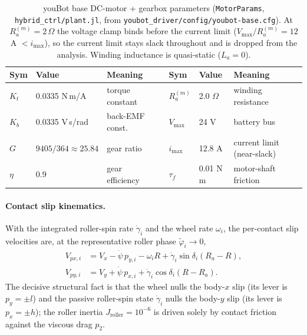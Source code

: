 \documentclass[11pt]{article}
\begin{document}
\begin{table}[h]\centering\small
\begin{tabular}{llll@{\hskip 2em}llll}
\toprule
Sym & Value & Meaning & & Sym & Value & Meaning\\
\midrule
$K_t$ & 0.0335 N\,m/A & torque constant & & $R_a^{(m)}$ & 2.0 $\Omega$ & winding resistance\\
$K_b$ & 0.0335 V\,s/rad & back-EMF const. & & $V_{\max}$ & 24 V & battery bus\\
$G$ & $9405/364\approx25.84$ & gear ratio & & $i_{\max}$ & 12.8 A & current limit (near-slack)\\
$\eta$ & 0.9 & gear efficiency & & $\tau_f$ & 0.01 N\,m & motor-shaft friction\\
\bottomrule
\end{tabular}
\caption{youBot base DC-motor + gearbox parameters (\texttt{MotorParams},
\texttt{hybrid\_ctrl/plant.jl}, from \texttt{youbot\_driver/config/youbot-base.cfg}). At
$R_a^{(m)}=2\,\Omega$ the voltage clamp binds before the current limit
($V_{\max}/R_a^{(m)}=12$ A $<i_{\max}$), so the current limit stays slack throughout and is
dropped from the analysis. Winding inductance is quasi-static ($L_a=0$).}
\label{tab:motor}
\end{table}

\paragraph{Contact slip kinematics.} With the integrated roller-spin rate $\dot\gamma_i$ and
the wheel rate $\omega_i$, the per-contact slip velocities are, at the representative roller
phase $\tilde\varphi_i\to0$,
\begin{align}
V_{px,i}&=V_x-\dot\psi\,p_{y,i}-\omega_i R+\dot\gamma_i\sin\delta_i(R_a-R),\\
V_{py,i}&=V_y+\dot\psi\,p_{x,i}+\dot\gamma_i\cos\delta_i(R-R_a).
\end{align}
The decisive structural fact is that the wheel nulls the body-$x$ slip (its lever is
$p_y=\pm l$) and the passive roller-spin state $\dot\gamma_i$ nulls the body-$y$ slip (its lever
is $p_x=\pm h$); the roller inertia $J_{\text{roller}}=10^{-6}$ is driven solely by contact
friction against the viscous drag $p_2$.
\end{document}
